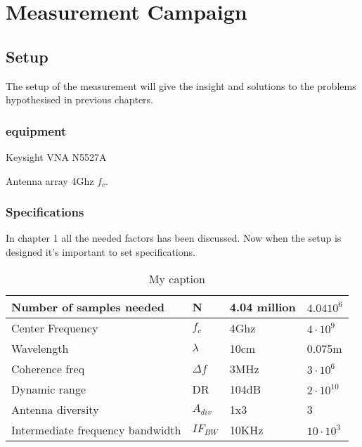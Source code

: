 \chapter{Measurement Campaign}
\section{Setup}
The setup of the measurement will give the insight and solutions to the problems hypothesised in previous chapters. 
\subsection{equipment}
\label{equip}
Keysight \gls{VNA} N5527A 

Antenna array 4Ghz $f_c$.


\subsection{Specifications}
In chapter 1 all the needed factors has been discussed. Now when the setup is designed it's important to set specifications.
\begin{table}[]
\centering
\caption{My caption}
\label{final_specs}
\begin{tabular}{|l|l|l|l|}
\hline
Number of samples needed         & N           & 4.04 million   & $4.04 10^6$        \\ \hline
Center Frequency                 & $f_c$       & 4Ghz           & $4 \cdot 10^9$     \\ \hline
Wavelength                       & $\lambda$   & 10cm           & 0.075m               \\ \hline
Coherence freq                   & $\Delta f$  & 3MHz           & $3 \cdot 10^6$     \\ \hline
Dynamic range                    & DR          & 104dB           & $2\cdot 10^10$             \\ \hline
Antenna diversity                & $A_{div}$   & 1x3            & 3                  \\ \hline
Intermediate frequency bandwidth & $IF_{BW}$     & 10KHz          & $10 \cdot 10^3$ \\ \hline
\end{tabular}
\end{table}
